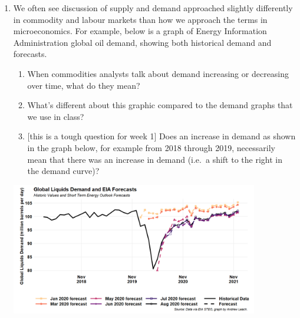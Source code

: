 \documentclass[11pt,]{article}
\providecommand{\tightlist}{%
  \setlength{\itemsep}{0pt}\setlength{\parskip}{0pt}}
\begin{document}
\begin{enumerate}
\def\labelenumi{\arabic{enumi}.}
\setcounter{enumi}{4}
\item
  We often see discussion of supply and demand approached slightly
  differently in commodity and labour markets than how we approach the
  terms in microeconomics. For example, below is a graph of Energy
  Information Administration global oil demand, showing both historical
  demand and forecasts.

  \begin{enumerate}
  \def\labelenumii{\alph{enumii})}
  \tightlist
  \item
    When commodities analysts talk about demand increasing or decreasing
    over time, what do they mean?
  \item
    What's different about this graphic compared to the demand graphs
    that we use in class?
  \item
    {[}this is a tough question for week 1{]} Does an increase in demand
    as shown in the graph below, for example from 2018 through 2019,
    necessarily mean that there was an increase in demand (i.e.~a shift
    to the right in the demand curve)?
  \end{enumerate}

  \centering

  \includegraphics[width=0.85\textwidth]{week_1_problems_files/figure-latex/demand_new.png}
\end{enumerate}
\end{document}
